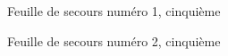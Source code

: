 \documentclass[a4paper,10pt]{article}
\begin{document}
\begin{feuilleExo}{Feuille de secours numéro 1, cinquième}
    \begin{multicols}{2}

    \end{multicols}
\end{feuilleExo}

\begin{feuilleExo}{Feuille de secours numéro 2, cinquième}
    \begin{multicols}{2}

    \end{multicols}
\end{feuilleExo}
\end{document}
